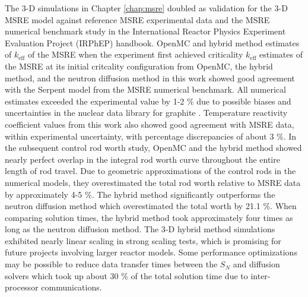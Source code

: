 The 3-D simulations in Chapter \ref{chap:msre} doubled as validation for the 3-D \gls{MSRE} model
against reference \gls{MSRE} experimental data and the \gls{MSRE} numerical benchmark study
\cite{fratoni_molten_2020} in
the International Reactor Physics Experiment Evaluation Project (IRPhEP) handbook. OpenMC and
hybrid method estimates of $k_\text{eff}$ of the \gls{MSRE} when the experiment first achieved criticality
$k_\text{eff}$ estimates of the \gls{MSRE} at its initial critcality configuration from OpenMC, the
hybrid method, and the neutron diffusion method in this work showed good agreement with the Serpent
model from the \gls{MSRE} numerical benchmark. All numerical estimates exceeded the experimental
value by 1-2 \% due to possible biases and uncertainties in the nuclear data library for graphite
\cite{fratoni_molten_2020}. Temperature reactivity coefficient values from this work also showed
good agreement with \gls{MSRE} data, within experimental uncertainty, with percentage discrepancies
of about 3 \%. In the subsequent control rod worth study, OpenMC and the hybrid method showed nearly
perfect overlap in the integral rod worth curve throughout the entire length of rod travel. Due to
geometric approximations of the control rods in the numerical models, they overestimated the total
rod worth relative to \gls{MSRE} data by approximately 4-5 \%. The hybrid method significantly
outperforms the neutron diffusion method which overestimated the total worth by 21.1 \%.
When comparing solution times, the hybrid method took approximately four times as long as the
neutron diffusion method.
The 3-D hybrid method simulations exhibited nearly linear scaling in strong scaling tests, which
is promising for future projects involving larger reactor models. Some performance optimizations
may be possible to reduce data transfer times between the $S_N$ and diffusion solvers which took
up about 30 \% of the total solution time due to inter-processor communications.


